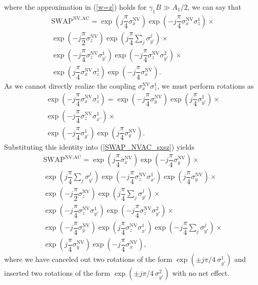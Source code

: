\documentclass[twocolumn]{revtex4}
\renewcommand{\t}{\text} %
\newcommand{\f}[2]{\dfrac{#1}{#2}} %
\newcommand{\p}[1]{\left(#1\right)} %
\newcommand{\SWAP}{\t{SWAP}}
\newcommand{\NV}{\t{NV}}
\newcommand{\AC}{\t{AC}}
\begin{document}
where the approximation in (\ref{w=z}) holds for $\gamma_1B\gg A_1/2$,
we can say that
\begin{multline}
  \SWAP^{\NV,\AC} = \exp\p{j\f\pi4\sigma_x^\NV}
  \exp\p{-j\f\pi4\sigma_x^\NV\sigma_z^1}
  \times \\
  \exp\p{-j\f\pi2\sigma_z^\NV} \exp\p{j\f\pi4\sum_j\sigma_{y'}^j}
  \times \\
  \exp\p{-j\f\pi4\sigma_z^\NV\sigma_{y'}^1}
  \exp\p{-j\f\pi4\sigma_z^\NV\sigma_{y'}^2}
  \times \\
  \exp\p{j\f\pi4\sigma_x^\NV\sigma_z^1} \exp\p{-j\f\pi4\sigma_x^\NV}.
  \label{SWAP_NVAC_sxsz}
\end{multline}
As we cannot directly realize the coupling $\sigma_x^\NV\sigma_z^1$,
we must perform rotations as
\begin{multline}
  \exp\p{-j\f\pi4\sigma_x^\NV\sigma_z^1} =
  \exp\p{-j\f\pi4\sigma_y^\NV} \exp\p{j\f\pi4\sigma_{y'}^1}
  \times \\
  \exp\p{-j\f\pi4\sigma_z^\NV\sigma_{x'}^1}
  \times \\
  \exp\p{-j\f\pi4\sigma_{y'}^1} \exp\p{j\f\pi4\sigma_y^\NV}.
\end{multline}
Substituting this identity into (\ref{SWAP_NVAC_sxsz}) yields
\begin{multline}
  \SWAP^{\NV,\AC} = \exp\p{j\f\pi4\sigma_x^\NV}
  \exp\p{-j\f\pi4\sigma_y^\NV}
  \times \\
  \exp\p{j\f\pi4\sum_j\sigma_{y'}^j}
  \exp\p{-j\f\pi4\sigma_z^\NV\sigma_{x'}^1}
  \exp\p{j\f\pi4\sigma_y^\NV}
  \times \\
  \exp\p{-j\f\pi2\sigma_z^\NV} \exp\p{j\f\pi4\sum_j\sigma_{y'}^j}
  \times \\
  \exp\p{-j\f\pi4\sigma_z^\NV\sigma_{y'}^1}
  \exp\p{-j\f\pi4\sigma_z^\NV\sigma_{y'}^2}
  \times \\
  \exp\p{-j\f\pi4\sigma_y^\NV}
  \exp\p{j\f\pi4\sigma_z^\NV\sigma_{x'}^1}
  \exp\p{-j\f\pi4\sum_j\sigma_{y'}^j}
  \times \\
  \exp\p{j\f\pi4\sigma_y^\NV} \exp\p{-j\f\pi4\sigma_x^\NV},
  \label{SWAP_NVAC}
\end{multline}
where we have canceled out two rotations of the form
$\exp\p{\pm j\pi/4~\sigma_{y'}^1}$ and inserted two rotations of the
form $\exp\p{\pm j\pi/4~\sigma_{y'}^2}$ with no net effect.
\end{document}
